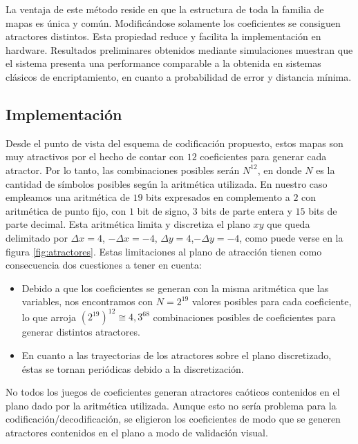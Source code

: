 La ventaja de este método reside en que la estructura de toda la familia de mapas es única y común.
Modificándose solamente los coeficientes se consiguen atractores distintos.
Esta propiedad reduce y facilita la implementación en hardware.
Resultados preliminares obtenidos mediante simulaciones muestran que el sistema presenta una performance comparable a la obtenida en sistemas clásicos de encriptamiento, en cuanto a probabilidad de error y distancia mínima.

\subsection{Implementación}

Desde el punto de vista del esquema de codificación propuesto, estos mapas son muy atractivos por el hecho de contar con $12$ coeficientes para generar cada atractor.
Por lo tanto, las combinaciones posibles serán $N^{12}$, en donde $N$ es la cantidad de símbolos posibles según la aritmética utilizada.
En nuestro caso empleamos una aritmética de $19$ bits expresados en complemento a $2$ con aritmética de punto fijo, con $1$ bit de signo, $3$ bits de parte entera y $15$ bits de parte decimal.
Esta aritmética limita y discretiza el plano $xy$ que queda delimitado por $\Delta x=4$, $-\Delta x=-4$, $\Delta y=4$,$-\Delta y=-4$, como puede verse en la figura \ref{fig:atractores}.
Estas limitaciones al plano de atracción tienen como consecuencia dos cuestiones a tener en cuenta:
\begin{itemize}
    \item
        Debido a que los coeficientes se generan con la misma aritmética que las variables, nos encontramos con $N=2^{19}$ valores posibles para cada coeficiente, lo que arroja $\left(2^{19}\right)^{12}\cong4,3^{68}$ combinaciones posibles de coeficientes para generar distintos atractores.
    \item
        En cuanto a las trayectorias de los atractores sobre el plano discretizado, éstas se tornan periódicas debido a la discretización.
\end{itemize}

No todos los juegos de coeficientes generan atractores caóticos contenidos en el plano dado por la aritmética utilizada.
Aunque esto no sería problema para la codificación/decodificación, se eligieron los coeficientes de modo que se generen atractores contenidos en el plano a modo de validación visual.

